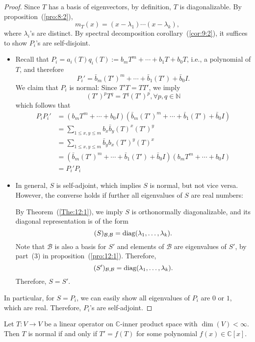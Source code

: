 \begin{proof}
Since $T$ has a basis of eigenvectors, by definition, $T$ is diagonalizable. By proposition~(\ref{pro:8:2}),
\[
m_T(x) = (x-\lambda_1)\cdots(x-\lambda_k),
\]
where $\lambda_i$'s are distinct.
By spectral decomposition corollary~(\ref{cor:9:2}), it suffices to show $P_i$'s are self-disjoint.
\begin{itemize}
\item
Recall that $P_i  =a_i(T)q_i(T):=b_mT^m+\cdots+b_1T+b_0T$, i.e., a polynomial of $T$, and therefore
\[
P_i' = \bar{b}_m(T')^m+\cdots+\bar{b}_1(T')+\bar{b}_0I.
\]
We claim that $P_i$ is normal: Since $T'T=TT'$, we imply
\[
(T')^pT^q = T^q(T')^p,\forall p,q\in\mathbb{N}
\]
which follows that 
\begin{align*}
P_iP_i'&=(b_mT^m+\cdots+b_0I)(\bar{b}_m(T')^m+\cdots+\bar{b}_1(T')+\bar{b}_0I)\\
&=\sum_{1\le x,y\le m}b_x\bar{b}_y(T)^x(T')^y\\
&=\sum_{1\le x,y\le m}\bar{b}_yb_x(T')^y(T)^x\\
&=(\bar{b}_m(T')^m+\cdots+\bar{b}_1(T')+\bar{b}_0I)(b_mT^m+\cdots+b_0I)\\
&=P_i'P_i
\end{align*}
\item
In general, $S$ is self-adjoint, which implies $S$ is normal, but not vice versa.
However, the converse holds if further all eigenvalues of $S$ are real numbers:

By Theorem~(\ref{The:12:1}), we imply $S$ is orthonormally diagonalizable, and its diagonal representation is of the form
\[
(S)_{\mathcal{B},\mathcal{B}}=\operatorname{diag}(\lambda_1,\dots,\lambda_k).
\]
Note that $\mathcal{B}$ is also a basis for $S'$ and elements of $\mathcal{B}$ are eigenvalues of $S'$, by part~(3) in proposition~(\ref{pro:12:1}).
Therefore,
\[
(S')_{\mathcal{B},\mathcal{B}}=\operatorname{diag}(\lambda_1,\dots,\lambda_k).
\]
Therefore, $S=S'$.
\end{itemize}
In particular, for $S=P_i$, we can easily show all eigenvalues of $P_i$ are 0 or $1$, which are real.
Therefore, $P_i$'s are self-adjoint.
\end{proof}


\begin{corollary}
Let $T:V\to V$ be a linear operator on $\mathbb{C}$-inner product space with $\dim(V)<\infty$.
Then $T$ is normal if and only if $T'=f(T)$ for some polynomial $f(x)\in\mathbb{C}[x]$.
\end{corollary}


